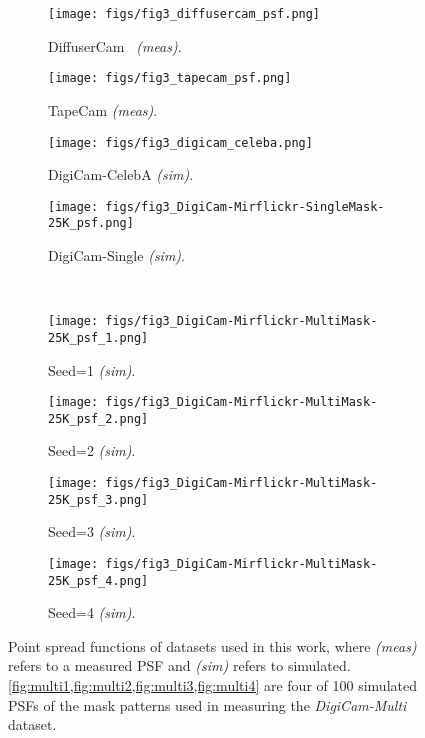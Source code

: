 \newcommand{\figsizepsf}{0.21}
\newcommand{\figsizepsfdigi}{0.21}
\begin{figure*}[t!]
    \centering
    \begin{subfigure}{\figsizepsf\linewidth}
		\centering
		\texttt{[image: figs/fig3\_diffusercam\_psf.png]} 
		\caption{DiffuserCam~\cite{Monakhova:19} \textit{(meas)}.}
		\label{fig:diffusercam}
	\end{subfigure}
    \begin{subfigure}{\figsizepsf\linewidth}
		\centering
		\texttt{[image: figs/fig3\_tapecam\_psf.png]} 
		\caption{TapeCam \textit{(meas)}.}
		\label{fig:tapecam}
	\end{subfigure}
 \begin{subfigure}{\figsizepsf\linewidth}
		\centering
		\texttt{[image: figs/fig3\_digicam\_celeba.png]} 
		\caption{DigiCam-CelebA \textit{(sim)}.}
		\label{fig:digicam_celeba}
	\end{subfigure}
 \begin{subfigure}{\figsizepsf\linewidth}
		\centering
  \texttt{[image: figs/fig3\_DigiCam-Mirflickr-SingleMask-25K\_psf.png]} 
		\caption{DigiCam-Single \textit{(sim)}.}
		\label{fig:digicam_mirflickr}
	\end{subfigure}
 \\[5pt]
 \begin{subfigure}{\figsizepsfdigi\linewidth}
		\centering
		\texttt{[image: figs/fig3\_DigiCam-Mirflickr-MultiMask-25K\_psf\_1.png]} 
		\caption{Seed=1 \textit{(sim)}.}
		\label{fig:multi1}
	\end{subfigure}
	\begin{subfigure}{\figsizepsfdigi\linewidth}
		\centering 
  \texttt{[image: figs/fig3\_DigiCam-Mirflickr-MultiMask-25K\_psf\_2.png]} 
		\caption{Seed=2 \textit{(sim)}.}
		\label{fig:multi2}
	\end{subfigure}
    \begin{subfigure}{\figsizepsfdigi\linewidth}
		\centering
		\texttt{[image: figs/fig3\_DigiCam-Mirflickr-MultiMask-25K\_psf\_3.png]} 
		\caption{Seed=3 \textit{(sim)}.}
		\label{fig:multi3}
	\end{subfigure}
    \begin{subfigure}{\figsizepsfdigi\linewidth}
		\centering
		\texttt{[image: figs/fig3\_DigiCam-Mirflickr-MultiMask-25K\_psf\_4.png]} 
		\caption{Seed=4 \textit{(sim)}.}
		\label{fig:multi4}
	\end{subfigure}
	\caption{Point spread functions of datasets used in this work, where \textit{(meas)} refers to a measured PSF and \textit{(sim)} refers to simulated. \cref{fig:multi1,fig:multi2,fig:multi3,fig:multi4} are four of 100 simulated PSFs of the mask patterns used in measuring the \textit{DigiCam-Multi} dataset.}
	\label{fig:compared_psfs_crop}
\end{figure*}

